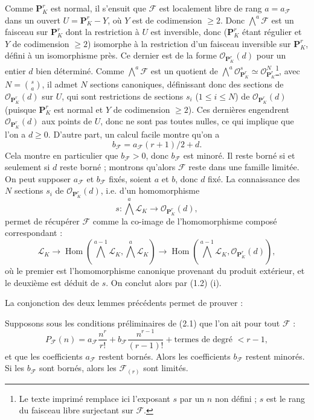 Comme $\mathbf P^r_K$ est normal, il s'ensuit que $\mathcal F$ est localement
libre de rang $a=a_{\mathcal F}$ dans un ouvert
$U=\mathbf P^r_K-Y$, où $Y$ est de codimension $\geq2$. Donc
$\bigwedge^a\mathcal F$ est un faisceau sur $\mathbf P^r_K$ dont la restriction
à $U$ est inversible, donc ($\mathbf P^r_K$ étant régulier et $Y$ de
codimension $\geq2$) isomorphe à la restriction d'un faisceau inversible sur
$\mathbf P^r_K$, défini à un isomorphisme près. Ce dernier est de la forme
$\mathcal O_{\mathbf P^r_K}(d)$ pour un entier $d$ bien déterminé. Comme
$\bigwedge^a\mathcal F$ est un quotient de
$\bigwedge^a\mathcal O_{\mathbf P^r_K}^{s}\simeq
\mathcal O_{\mathbf P^r_K}^{N}$\footnote{Le texte imprimé remplace ici
l'exposant $s$ par un $n$ non défini ; $s$ est le rang du faisceau libre
surjectant sur $\mathcal F$.}, avec $N=\binom{s}{a}$, il admet $N$ sections
canoniques, définissant donc des sections de
$\mathcal O_{\mathbf P^r_K}(d)$ sur $U$, qui sont restrictions de sections
$s_i$ ($1\leq i\leq N$) de $\mathcal O_{\mathbf P^r_K}(d)$ (puisque
$\mathbf P^r_K$ est normal et $Y$ de codimension $\geq2$). Ces dernières
engendrent $\mathcal O_{\mathbf P^r_K}(d)$ aux points de $U$, donc ne sont pas
toutes nulles, ce qui implique que l'on a $d\geq0$. D'autre part, un calcul
facile montre qu'on a
\[
b_{\mathcal F}=a_{\mathcal F}(r+1)/2+d.
\]
Cela montre en particulier que $b_{\mathcal F}>0$, donc $b_{\mathcal F}$ est
minoré. Il reste borné si et seulement si $d$ reste borné ; montrons qu'alors
$\mathcal F$ reste dans une famille limitée. On peut supposer
$a_{\mathcal F}$ et $b_{\mathcal F}$ fixés, soient $a$ et $b$, donc $d$ fixé.
La connaissance des $N$ sections $s_i$ de $\mathcal O_{\mathbf P^r_K}(d)$,
i.e. d'un homomorphisme
\[
s:\bigwedge^a\mathcal L_K\longrightarrow\mathcal O_{\mathbf P^r_K}(d),
\]
permet de récupérer $\mathcal F$ comme la co-image de l'homomorphisme composé
correspondant :
\[
\mathcal L_K\longrightarrow
\operatorname{Hom}\!\left(\bigwedge^{a-1}\mathcal L_K,
\bigwedge^a\mathcal L_K\right)\longrightarrow
\operatorname{Hom}\!\left(\bigwedge^{a-1}\mathcal L_K,
\mathcal O_{\mathbf P^r_K}(d)\right),
\]
où le premier est l'homomorphisme canonique provenant du produit extérieur, et
le deuxième est déduit de $s$. On conclut alors par (1.2) (i).

La conjonction des deux lemmes précédents permet de prouver :

 Supposons sous les conditions préliminaires de (2.1) que
l'on ait pour tout $\mathcal F$ :
\[
P_{\mathcal F}(n)=a_{\mathcal F}\frac{n^r}{r!}
+b_{\mathcal F}\frac{n^{r-1}}{(r-1)!}
+\text{termes de degré $<r-1$},
\]
et que les coefficients $a_{\mathcal F}$ restent bornés. Alors les coefficients
$b_{\mathcal F}$ restent minorés. Si les $b_{\mathcal F}$ sont bornés, alors
les $\mathcal F_{(r)}$ sont limités.

